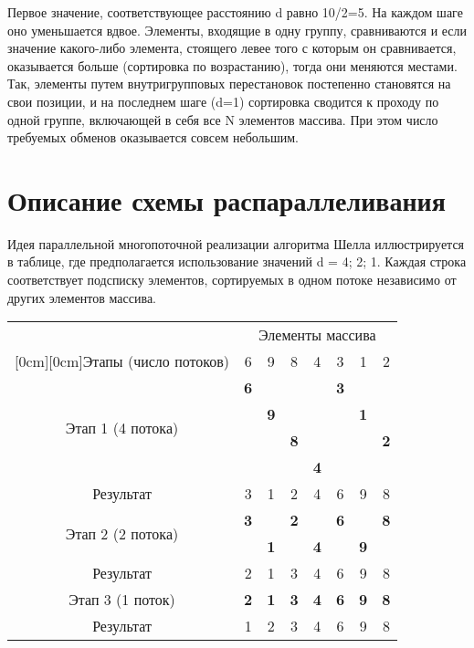 \documentclass{report}
\begin{document}
Первое значение, соответствующее расстоянию d равно 10/2=5. На каждом шаге оно уменьшается вдвое. Элементы, входящие в одну группу, сравниваются и если значение какого-либо элемента, стоящего левее того с которым он сравнивается, оказывается больше (сортировка по возрастанию), тогда они меняются местами. Так, элементы путем внутригрупповых перестановок постепенно становятся на свои позиции, и на последнем шаге (d=1) сортировка сводится к проходу по одной группе, включающей в себя все N элементов массива. При этом число требуемых обменов оказывается совсем небольшим.

\newpage

\section*{Описание схемы распараллеливания}

Идея параллельной многопоточной реализации алгоритма Шелла иллюстрируется в таблице, где предполагается использование значений {d = 4; 2; 1}. Каждая строка соответствует подсписку элементов, сортируемых в одном потоке независимо от других элементов массива.


\begin{center}
\begin{tabular}{| c | c | c | c | c | c | c | c |}\hline
& \multicolumn{7}{c|}{Элементы массива} \\
\cline{2-8}
\raisebox{1.5ex}[0cm][0cm]{Этапы (число потоков)}
& 6 & 9 & 8 & 4 & 3 & 1 & 2 \\ \hline
\hline
\multirow{4}{*}{Этап 1 (4 потока)} & \textbf{6} & & & & \textbf{3} & &  \\ \cline{2-8}
 & & \textbf{9} & & & & \textbf{1} & \\ \cline{2-8}
 & & & \textbf{8} & & & & \textbf{2} \\ \cline{2-8}
 & & & & \textbf{4} & & & \\ \hline
Результат & 3 & 1 & 2 & 4 & 6 & 9 & 8 \\ \hline
 \hline
\multirow{2}{*}{Этап 2 (2 потока)} & \textbf{3} & & \textbf{2} & & \textbf{6} & & \textbf{8} \\ \cline{2-8}
 & & \textbf{1} & & \textbf{4} & & \textbf{9} & \\ \hline
Результат & 2 & 1 & 3 & 4 & 6 & 9 & 8 \\ \hline
 \hline
\multirow{1}{*}{Этап 3 (1 поток)} & \textbf{2} & \textbf{1} & \textbf{3} & \textbf{4} & \textbf{6} & \textbf{9} & \textbf{8} \\ \hline
Результат & 1 & 2 & 3 & 4 & 6 & 9 & 8 \\ \hline
\end{tabular}    
\end{center}
\end{document}
